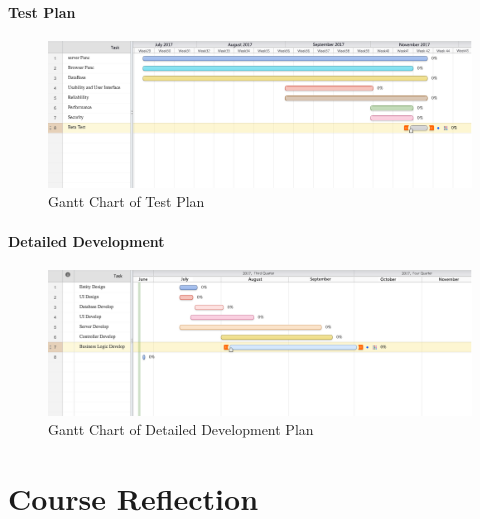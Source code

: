 \documentclass[12pt]{scrreprt}
\begin{document}
\subsubsection{Test Plan}
\begin{figure}[H]
	\centering\includegraphics[width=6in]{DocumentRes/TestPlan.png}
	\caption{Gantt Chart of Test Plan}
\end{figure}
\subsubsection{Detailed Development}
\begin{figure}[H]
	\centering\includegraphics[width=6in]{DocumentRes/DetailDevelopmentPlan}
	\caption{Gantt Chart of Detailed Development Plan}
\end{figure}

\chapter{Course Reflection}
\end{document}
